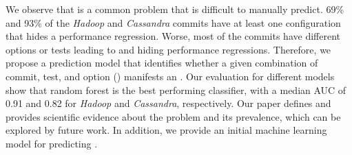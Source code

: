 We observe that \inconsistent is a common problem that is difficult to manually predict. 69\% and 93\% of the \emph{Hadoop} and \emph{Cassandra} commits have at least one configuration that hides a performance regression. 
Worse, most of the commits have different options or tests leading to \inconsistent and hiding performance regressions.
Therefore, we propose a prediction model that identifies whether a given combination of commit, test, and option (\textbf{\instance}) manifests an \inconsistent.  %
Our evaluation for different models show that random forest is the best performing classifier, with a median AUC of 0.91 and 0.82 for \emph{Hadoop} and \emph{Cassandra}, respectively. 
Our paper defines and provides scientific evidence about the \inconsistent problem and its prevalence, which can be explored by future work. In addition, we provide an initial machine learning model for predicting \inconsistent.
